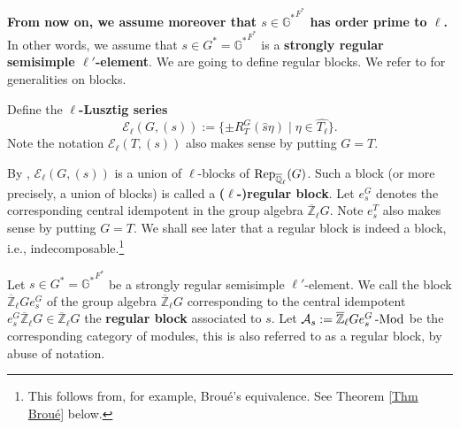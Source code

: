 		\textbf{From now on, we assume moreover that $s \in {\mathbb{G}^*}^{F^*}$ has order prime to $\ell$.} In other words, we assume that $s \in G^*={\mathbb{G}^*}^{F^*}$ is a \textbf{strongly regular semisimple $\ell'$-element}. We are going to define regular blocks. We refer to \cite[Appendix B]{bonnafe2010representations} for generalities on blocks.
		
		Define the \textbf{$\ell$-Lusztig series} 
		$$\mathcal{E}_\ell(G, (s)):=\{\pm R_T^G(\hat{s}\eta)\;|\; \eta \in \widehat{T_\ell}\}.$$ Note the notation $\mathcal{E}_\ell(T, (s))$ also makes sense by putting $G=T$.
		
		By \cite{michel1989bloc}, $\mathcal{E}_\ell(G, (s))$ is a union of $\ell$-blocks of $\operatorname{\operatorname{Rep}}_{\overline{\mathbb{Q}}_{\ell}}(G)$. Such a block (or more precisely, a union of blocks) is called a \textbf{($\ell$-)regular block}. Let $e_s^G$ denotes the corresponding central idempotent in the group algebra $\overline{\mathbb{Z}}_{\ell}G$. Note $e_s^T$ also makes sense by putting $G=T$. We shall see later that a regular block is indeed a block, i.e., indecomposable.\footnote{This follows from, for example, Broué's equivalence. See Theorem \ref{Thm Broué} below.}
		
		\begin{definition}\label{Def Regular Block}
			Let $s \in G^*={\mathbb{G}^*}^{F^*}$ be a strongly regular semisimple $\ell'$-element.
			We call the block $\overline{\mathbb{Z}}_{\ell}Ge_s^G$ of the group algebra $\overline{\mathbb{Z}}_{\ell}G$ corresponding to the central idempotent $e_s^G\overline{\mathbb{Z}}_{\ell}G \in \overline{\mathbb{Z}}_{\ell}G$ the \textbf{regular block} associated to $s$. Let $\mathcal{A}_s:=\overline{\mathbb{Z}}_{\ell}Ge_s^G\operatorname{-Mod}$ be the corresponding category of modules, this is also referred to as a regular block, by abuse of notation.
			
			
		\end{definition}
		
		
